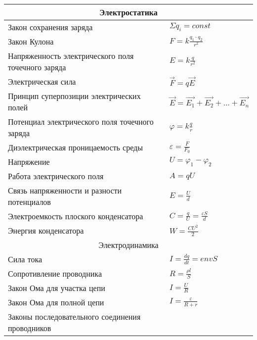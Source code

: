 \documentclass{article}
\begin{document}
    \begin{center}
        \begin{tabular}{ l l }
            \hline
            \hline
            \multicolumn{2}{c}{Электростатика} \\
            \hline
            \hline
            Закон сохранения заряда & \(\Sigma q_i = const\) \\
            \hline
            Закон Кулона & \(F = k\frac{q_1 \cdot q_2}{r^2}\) \\
            \hline
            Напряженность электрического поля точечного заряда & \(E = k\frac{q}{r^2}\) \\
            \hline
            Электрическая сила & \( \vec{F} = q\vec{E} \) \\
            \hline
            Принцип суперпозиции электрических полей & \( \vec{E} = \vec{E_1} + \vec{E_2} + ... + \vec{E_n} \) \\
            \hline
            Потенциал электрического поля точечного заряда & \( \varphi = k\frac{q}{r} \) \\
            \hline
            Диэлектрическая проницаемость среды & \( \varepsilon = \frac{F}{F_0} \) \\
            \hline
            Напряжение & \( U = \varphi_1 - \varphi_2 \) \\
            \hline
            Работа электрического поля & \( A = qU \) \\
            \hline
            Связь напряженности и разности потенциалов & \( E = \frac{U}{d} \) \\
            \hline
            Электроемкость плоского конденсатора & \( C = \frac{q}{U} = \frac{\varepsilon S}{d} \) \\
            \hline
            Энергия конденсатора & \( W = \frac{CU^2}{2} \) \\
            \hline
            \hline
            \multicolumn{2}{c}{Электродинамика} \\
            \hline
            \hline
            Сила тока & \( I = \frac{dq}{dt} = envS \) \\
            \hline
            Сопротивление проводника & \( R = \frac{\rho l}{S} \) \\
            \hline
            Закон Ома для участка цепи & \( I = \frac{U}{R} \) \\
            \hline
            Закон Ома для полной цепи & \( I = \frac{\varepsilon}{R + r} \) \\
            \hline
            Законы последовательного соединения проводников & \(\begin{array}{l}

\end{array}
\end{tabular}
\end{center}
\end{document}
